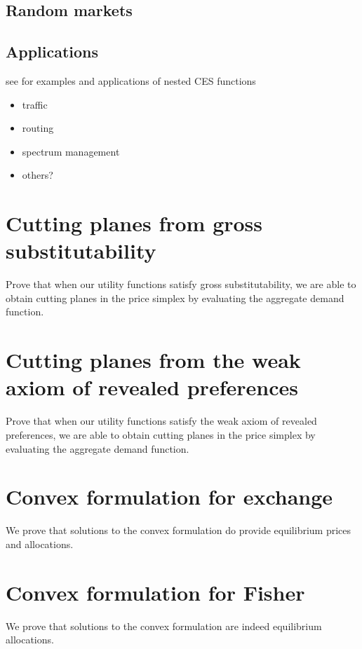 \documentclass[12pt]{article}
\begin{document}
\subsection{Random markets}

\subsection{Applications}
\cite{shoven1992applying}

see \cite{shoven1992applying} for examples and applications of nested CES functions

\begin{itemize}
\item traffic
\item routing
\item spectrum management
\item others?
\end{itemize}

\appendix
\section{Cutting planes from gross substitutability}
Prove that when our utility functions satisfy gross substitutability,
we are able to obtain cutting
planes in the price simplex by evaluating the aggregate demand function.

\section{Cutting planes from the weak axiom of revealed preferences}
Prove that when our utility functions satisfy the
weak axiom of revealed preferences, we are able to obtain cutting
planes in the price simplex by evaluating the aggregate demand function.

\section{Convex formulation for exchange}
\label{sec:exchange_proof}
We prove that solutions to the convex formulation %
do provide equilibrium prices and allocations.

\section{Convex formulation for Fisher}
\label{sec:fisher_proof}
We prove that solutions to the convex formulation %
are indeed equilibrium allocations.
\end{document}
